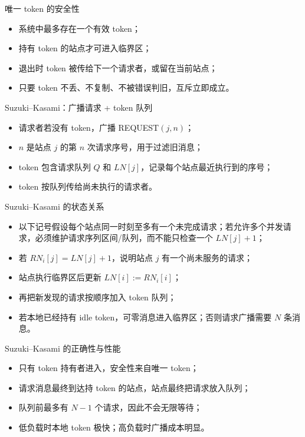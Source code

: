 \documentclass[UTF8,fontset=none,aspectratio=169,10pt]{beamer}
\begin{document}

\begin{frame}{唯一 token 的安全性}
\begin{itemize}
  \item 系统中最多存在一个有效 token；
  \item 持有 token 的站点才可进入临界区；
  \item 退出时 token 被传给下一个请求者，或留在当前站点；
  \item 只要 token 不丢、不复制、不被错误判旧，互斥立即成立。
\end{itemize}
\vfill
{}
\end{frame}

\begin{frame}{Suzuki--Kasami：广播请求 + token 队列}
\begin{itemize}
  \item 请求者若没有 token，广播 REQUEST$(j,n)$；
  \item $n$ 是站点 $j$ 的第 $n$ 次请求序号，用于过滤旧消息；
  \item token 包含请求队列 $Q$ 和 $LN[j]$，记录每个站点最近执行到的序号；
  \item token 按队列传给尚未执行的请求者。
\end{itemize}
\end{frame}

\begin{frame}{Suzuki--Kasami 的状态关系}
\begin{itemize}
  \item 以下记号假设每个站点同一时刻至多有一个未完成请求；若允许多个并发请求，必须维护请求序列区间/队列，而不能只检查一个 $LN[j]+1$；
  \item 若 $RN_i[j]=LN[j]+1$，说明站点 $j$ 有一个尚未服务的请求；
  \item 站点执行临界区后更新 $LN[i]:=RN_i[i]$；
  \item 再把新发现的请求按顺序加入 token 队列；
  \item 若本地已经持有 idle token，可零消息进入临界区；否则请求广播需要 $N$ 条消息。
\end{itemize}
\end{frame}

\begin{frame}{Suzuki--Kasami 的正确性与性能}
\begin{itemize}
  \item 只有 token 持有者进入，安全性来自唯一 token；
  \item 请求消息最终到达持 token 的站点，站点最终把请求放入队列；
  \item 队列前最多有 $N-1$ 个请求，因此不会无限等待；
  \item 低负载时本地 token 极快；高负载时广播成本明显。
\end{itemize}
\end{frame}
\end{document}
